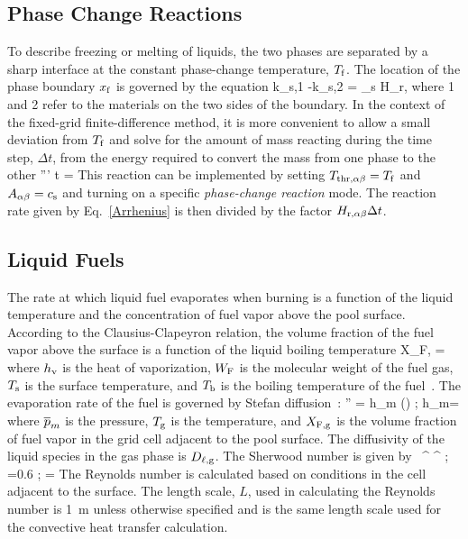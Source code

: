 \subsection{Phase Change Reactions}

To describe freezing or melting of liquids, the two phases are separated by a sharp interface at the constant phase-change temperature, $T_{\rm f}$. The location of the phase boundary $x_{\rm f}$ is governed by the equation
\be
k_{\rm s,1} -k_{\rm s,2} = \rho_{\rm s} H_{\rm r,\alpha\beta} 
\ee
where 1 and 2 refer to the materials on the two sides of the boundary. In the context of the fixed-grid finite-difference method, it is more convenient
to allow a small deviation from $T_{\rm f}$ and solve for the amount of mass reacting during the time step, $\Delta t$,
from the energy required to convert the mass from one phase to the other
\be
{}''' \Delta t = 
\ee
This reaction can be implemented by setting $T_{\rm thr,\alpha\beta} = T_{\rm f}$ and $A_{\alpha\beta} = c_{\rm s}$ and turning on a specific
{\em phase-change reaction} mode. The reaction rate given by Eq.~\ref{Arrhenius} is then divided by the factor $H_{\rm r,\alpha\beta} \Delta t$.

\subsection{Liquid Fuels}

The rate at which liquid fuel evaporates when burning is a function of the liquid temperature and the concentration of fuel vapor above the pool surface. According to the Clausius-Clapeyron relation, the volume fraction of the fuel vapor above the surface is a function of the liquid boiling temperature
\be X_{\rm F,\ell} = \exp {}
\label{CC_liquid}
\ee
where $h_{\rm v}$ is the heat of vaporization, $W_{\rm F}$ is the molecular weight of the fuel gas, $T_{\rm s}$ is the surface temperature, and $T_{\rm b}$ is the boiling temperature of the fuel~\cite{Prasad:1}. The evaporation rate of the fuel is governed by Stefan diffusion~\cite{Taylor&Krishna}:
\be
{}'' = h_{\rm m} \;  \; \ln \left(\right) \quad ; \quad h_{\rm m}= 
\ee
where $\overline{p}_m$ is the pressure, $T_{\rm g}$ is the temperature, and $X_{\rm F,g}$ is the volume fraction of fuel vapor in the grid cell adjacent to the pool surface. The diffusivity of the liquid species in the gas phase is $D_{\rm \ell,g}$.  The Sherwood number is given by
\be
{}~\SC^{} \RE^{} \quad ; =0.6 \quad ; \quad \RE= 
\ee
The Reynolds number is calculated based on conditions in the cell adjacent to the surface. The length scale, $L$, used in calculating the Reynolds number is \SI{1}{m} unless otherwise specified and is the same length scale used for the convective heat transfer calculation.

